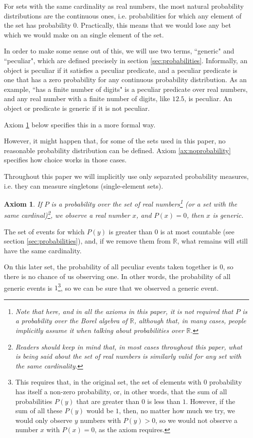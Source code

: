\documentclass[a4paper
,draft
]{article}
\def\reale{\mathbb{R}}
\newcommand{\paper}[1]{paper}
\newcommand{\ghilimele}[1]{``#1"}
\newtheorem{axiom}{Axiom}
\begin{document}
For sets with the same cardinality as real numbers,
the most natural probability distributions are the continuous
ones, i.e. probabilities for which any element of the set has probability $0$.
Practically, this means that we would lose any bet which we would make on an
single element of the set.

In order to make some sense out of this, we will use two terms,
\ghilimele{generic} and \ghilimele{peculiar},
which are defined precisely in section \ref{sec:probabilities}.
Informally,
an object is peculiar if it satisfies a peculiar predicate, and a peculiar
predicate is one that has a zero probability for any continuous probability
distribution.
As an example,
\ghilimele{has a finite number of digits} is a peculiar
predicate over real numbers, and any real number with a finite number
of digits, like $12.5$, is peculiar. An object or predicate is generic if
it is not peculiar.

Axiom \ref{ax:zeroisgeneric} below specifies this in a more formal way.

However, it might happen that, for some of the sets used in this \paper{},
no reasonable probability distribution can be defined.
Axiom \ref{ax:noprobability} specifies how choice works in those cases.

Throughout this paper we will implicitly use only separated probability
measures, i.e. they can measure singletons (single-element sets).

\begin{axiom}
  \label{ax:zeroisgeneric}
  If $P$ is a probability over the set of real numbers\footnote{Note
    that here, and in all the axioms in this paper, it is not required that
    $P$ is a probability over the
    Borel algebra of $\reale$, although that, in many cases, people implicitly
    assume it when talking about probabilities over $\reale$.
  }
  (or a set with the same cardinal)\footnote{
    Readers should
    keep in mind that, in most cases throughout this paper, what is being said
    about the set of real numbers is similarly valid for any set with the same
    cardinality.},
  we observe a real number $x$, and $P(x)=0$, then $x$ is generic.
\end{axiom}

The set of events for which $P(y)$ is
greater than $0$ is at most countable (see section \ref{sec:probabilities}),
and, if we remove them from $\reale$, what remains will still have
the same cardinality.

On this later set, the probability
of all peculiar events taken together is $0$, so there is no chance of us
observing one.
In other words, the probability of all generic events is $1$\footnote{This
  requires that, in the original set, the set of elements with $0$ probability
  has itself a non-zero probability, or, in other words, that the sum of all
  probabilities $P(y)$ that are greater than $0$ is less than $1$.
  However, if the sum of all these $P(y)$ would be $1$, then, no matter how much
  we try, we would only observe $y$ numbers with $P(y) > 0$,
  so we would not observe a number $x$ with $P(x)=0$,
  as the axiom requires.
},
so we can be sure that we observed a generic event.
\end{document}
